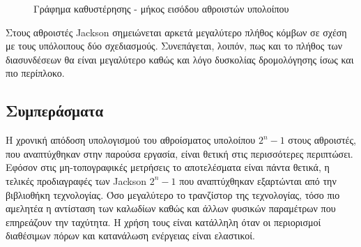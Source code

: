 \begin{figure}[H]
\begin{center}
\end{center}
\caption{Γράφημα καθυστέρησης - μήκος εισόδου αθροιστών υπολοίπου}   
\label{graph:gap_between_interconection_and_gates_delay}
\end{figure}


Στους αθροιστές Jackson σημειώνεται αρκετά μεγαλύτερο πλήθος κόμβων σε σχέση με τους υπόλοιπους δύο σχεδιασμούς. Συνεπάγεται, λοιπόν, πως και το πλήθος των διασυνδέσεων θα είναι μεγαλύτερο καθώς και λόγο δυσκολίας δρομολόγησης ίσως και πιο περίπλοκο.




\subsection{Συμπεράσματα}

Η χρονική απόδοση υπολογισμού του αθροίσματος υπολοίπου $2^n-1$ στους αθροιστές, που αναπτύχθηκαν στην παρούσα εργασία, είναι θετική στις περισσότερες περιπτώσει. Εφόσον στις μη-τοπογραφικές μετρήσεις το αποτελέσματα είναι πάντα θετικά, η τελικές προδιαγραφές των Jackson $2^n-1$ που αναπτύχθηκαν εξαρτώνται από την βιβλιοθήκη τεχνολογίας. Όσο μεγαλύτερο το τρανζίστορ της τεχνολογίας, τόσο πιο αμελητέα η αντίσταση των καλωδίων καθώς και άλλων φυσικών παραμέτρων που επηρεάζουν την ταχύτητα. Η χρήση τους είναι κατάλληλη όταν οι περιορισμοί διαθέσιμων πόρων και κατανάλωση ενέργειας είναι ελαστικοί. 

